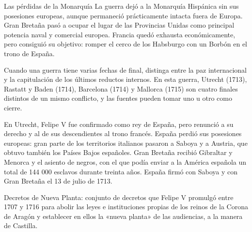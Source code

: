 \documentclass{book}
\begin{document}
\begin{tcolorbox}[title={Consejo}, studiumtip, breakable]

Las pérdidas de la Monarquía
La guerra dejó a la Monarquía Hispánica sin sus posesiones europeas, aunque permaneció prácticamente intacta fuera de Europa. Gran Bretaña pasó a ocupar el lugar de las Provincias Unidas como principal potencia naval y comercial europea. Francia quedó exhausta económicamente, pero consiguió su objetivo: romper el cerco de los Habsburgo con un Borbón en el trono de España.


Cuando una guerra tiene varias fechas de final, distinga entre la paz internacional y la capitulación de los últimos reductos internos. En esta guerra, Utrecht (1713), Rastatt y Baden (1714), Barcelona (1714) y Mallorca (1715) son cuatro finales distintos de un mismo conflicto, y las fuentes pueden tomar uno u otro como cierre.

\end{tcolorbox}

\begin{tcolorbox}[title={Definición}, studiumdef, breakable]

En Utrecht, Felipe V fue confirmado como rey de España, pero renunció a su derecho y al de sus descendientes al trono francés. España perdió sus posesiones europeas: gran parte de los territorios italianos pasaron a Saboya y a Austria, que obtuvo también los Países Bajos españoles. Gran Bretaña recibió Gibraltar y Menorca y el asiento de negros, con el que podía enviar a la América española un total de 144 000 esclavos durante treinta años. España firmó con Saboya y con Gran Bretaña el 13 de julio de 1713.

\end{tcolorbox}

\begin{tcolorbox}[title={Definición}, studiumdef, breakable]

Decretos de Nueva Planta: conjunto de decretos que Felipe V promulgó entre 1707 y 1716 para abolir las leyes e instituciones propias de los reinos de la Corona de Aragón y establecer en ellos la «nueva planta» de las audiencias, a la manera de Castilla.

\end{tcolorbox}
\end{document}
